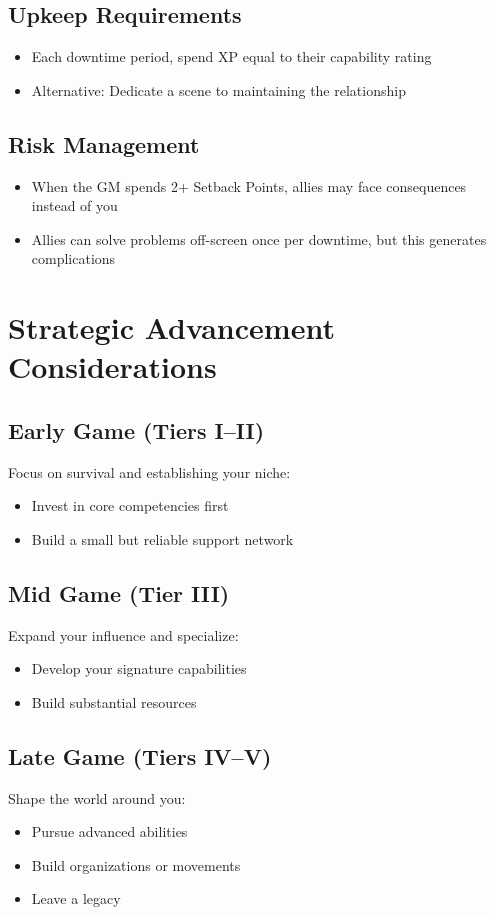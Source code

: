 \begin{multicols}{2}
\subsection*{Upkeep Requirements}
\begin{itemize}
\item Each downtime period, spend XP equal to their capability rating
\item Alternative: Dedicate a scene to maintaining the relationship
\end{itemize}

\subsection*{Risk Management}
\begin{itemize}
\item When the GM spends 2+ Setback Points, allies may face consequences instead of you
\item Allies can solve problems off-screen once per downtime, but this generates complications
\end{itemize}

\section{Strategic Advancement Considerations}

\subsection*{Early Game (Tiers I–II)}
Focus on survival and establishing your niche:
\begin{itemize}
\item Invest in core competencies first
\item Build a small but reliable support network
\end{itemize}

\subsection*{Mid Game (Tier III)}
Expand your influence and specialize:
\begin{itemize}
\item Develop your signature capabilities
\item Build substantial resources
\end{itemize}

\subsection*{Late Game (Tiers IV–V)}
Shape the world around you:
\begin{itemize}
\item Pursue advanced abilities
\item Build organizations or movements
\item Leave a legacy
\end{itemize}


\end{multicols}
